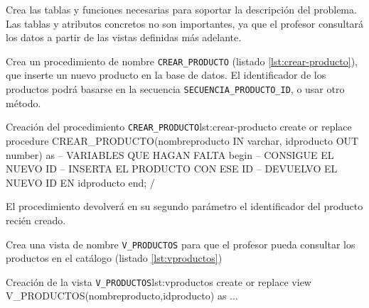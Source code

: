\begin{homeworkProblem}
  Crea las tablas y funciones necesarias para soportar la descripción del problema. Las tablas y atributos concretos no son importantes, ya que el profesor consultará los datos a partir de las vistas definidas más adelante.
\end{homeworkProblem}

\begin{homeworkProblem}
  Crea un procedimiento de nombre \texttt{CREAR\_PRODUCTO} (listado \ref{lst:crear-producto}), que inserte un nuevo producto en la base de datos.  El identificador de los productos podrá basarse en la secuencia \texttt{SECUENCIA\_PRODUCTO\_ID}, o usar otro método.

  \begin{listadosql}{Creación del procedimiento \texttt{CREAR\_PRODUCTO}}{lst:crear-producto}
create or replace procedure CREAR_PRODUCTO(nombreproducto IN varchar, idproducto OUT number)
as 
  -- VARIABLES QUE HAGAN FALTA
begin
  -- CONSIGUE EL NUEVO ID 
  -- INSERTA EL PRODUCTO CON ESE ID
  -- DEVUELVO EL NUEVO ID EN idproducto
end;
/
\end{listadosql}

  El procedimiento devolverá en su segundo parámetro el identificador del producto recién creado.

  Crea una vista de nombre \texttt{V\_PRODUCTOS} para que el profesor pueda consultar los productos en el catálogo (listado \ref{lst:vproductos})
  
  \begin{listadosql}{Creación de la vista \texttt{V\_PRODUCTOS}}{lst:vproductos}
  create or replace view V_PRODUCTOS(nombreproducto,idproducto) as
  ...
  \end{listadosql}


  
\end{homeworkProblem}

